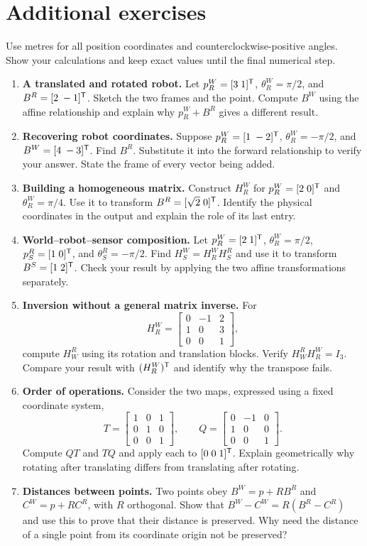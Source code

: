 \clearpage
\section{Additional exercises}
Use metres for all position coordinates and counterclockwise-positive angles.
Show your calculations and keep exact values until the final numerical step.
\begin{enumerate}
\item \textbf{A translated and rotated robot.}
Let $p_R^W=[3\;1]^{\mathsf T}$, $\theta_R^W=\pi/2$, and
$B^R=[2\;-1]^{\mathsf T}$. Sketch the two frames and the point. Compute $B^W$
using the affine relationship and explain why $p_R^W+B^R$ gives a different result.

\item \textbf{Recovering robot coordinates.}
Suppose $p_R^W=[1\;-2]^{\mathsf T}$, $\theta_R^W=-\pi/2$, and
$B^W=[4\;-3]^{\mathsf T}$. Find $B^R$. Substitute it into the forward
relationship to verify your answer. State the frame of every vector being added.

\item \textbf{Building a homogeneous matrix.}
Construct $H_R^W$ for $p_R^W=[2\;0]^{\mathsf T}$ and $\theta_R^W=\pi/4$.
Use it to transform $B^R=[\sqrt2\;0]^{\mathsf T}$. Identify the physical
coordinates in the output and explain the role of its last entry.

\item \textbf{World--robot--sensor composition.}
Let $p_R^W=[2\;1]^{\mathsf T}$, $\theta_R^W=\pi/2$,
$p_S^R=[1\;0]^{\mathsf T}$, and $\theta_S^R=-\pi/2$.
Find $H_S^W=H_R^W H_S^R$ and use it to transform $B^S=[1\;2]^{\mathsf T}$.
Check your result by applying the two affine transformations separately.

\item \textbf{Inversion without a general matrix inverse.}
For
\[
 H_R^W=\begin{bmatrix}0&-1&2\\1&0&3\\0&0&1\end{bmatrix},
\]
compute $H_W^R$ using its rotation and translation blocks. Verify
$H_W^R H_R^W=I_3$. Compare your result with $(H_R^W)^{\mathsf T}$ and identify
why the transpose fails.

\item \textbf{Order of operations.}
Consider the two maps, expressed using a fixed coordinate system,
\[
 T=\begin{bmatrix}1&0&1\\0&1&0\\0&0&1\end{bmatrix},\qquad
 Q=\begin{bmatrix}0&-1&0\\1&0&0\\0&0&1\end{bmatrix}.
\]
Compute $QT$ and $TQ$ and apply each to $[0\;0\;1]^{\mathsf T}$.
Explain geometrically why rotating after translating differs from translating
after rotating.

\item \textbf{Distances between points.}
Two points obey $B^W=p+RB^R$ and $C^W=p+RC^R$, with $R$ orthogonal.
Show that $B^W-C^W=R(B^R-C^R)$ and use this to prove that their distance
is preserved. Why need the distance of a single point from its coordinate
origin not be preserved?
\end{enumerate}
